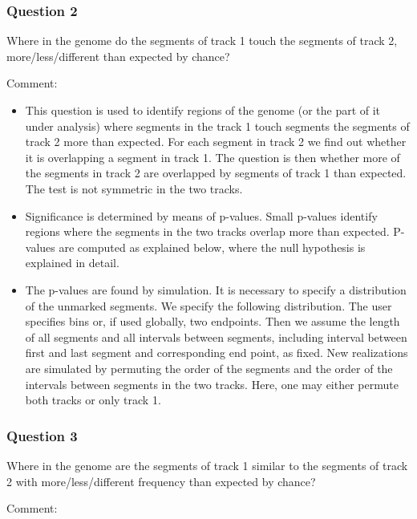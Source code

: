 \documentclass{article}
\begin{document}
\subsubsection{Question 2}

Where in the genome do the segments of track 1 touch the segments of track 2, more/less/different
 than expected by chance?



\vspace{5mm}
 Comment:

\begin{itemize}
	\item This question is used to identify regions of the genome (or the part of it under analysis) where 
segments in the track 1 touch segments the segments of track 2  more than expected. For each segment in track 2
we find out whether it is overlapping a segment in track 1. The question is then whether more of the 
segments in track 2 are overlapped by segments of track 1 than expected.
The test is not symmetric in the two tracks. 
	\item Significance is determined by means of p-values. Small p-values identify regions where the segments
in the two tracks overlap more than expected.  P-values are computed as explained below, where the null hypothesis is explained in detail.
	\item The p-values are found by simulation. It is necessary to specify a distribution of the unmarked 
segments. We specify the following distribution. The user specifies bins or, if used globally, two endpoints. Then we 
assume the length of all segments and all intervals between segments, including interval between first and last
segment and corresponding end point, as fixed. New realizations are simulated by permuting the order of the 
segments and the order of the intervals between segments in the two tracks.   Here, one may either permute both
tracks or only track 1.
\end{itemize}

\subsubsection{Question 3}

Where in the genome are the segments of track 1  similar to the segments of track 2 with  more/less/different 
frequency than expected by chance?


\vspace{5mm}
 Comment:
\end{document}
